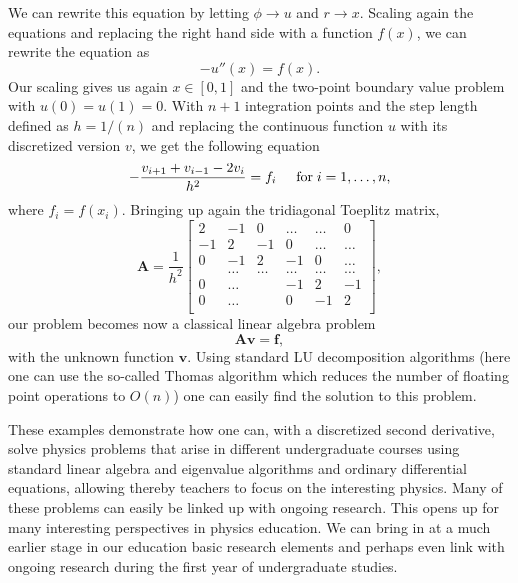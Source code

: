 \documentclass[graybox,envcountchap,sectrefs]{svmult}
\begin{document}
We can  rewrite this equation by letting $\phi\rightarrow u$ and
$r\rightarrow x$.  Scaling again the equations and replacing the right hand side with a function $f(x)$, we can rewrite the
equation as
\[
-u''(x) = f(x).
\]
Our scaling gives us again $x\in [0,1]$ and the two-point boundary value problem
with $u(0)=u(1)=0$. With $n+1$ integration points and
the step length defined as $h=1/(n)$ and replacing the continuous function $u$ with its discretized version $v$, we get
the following equation
\begin{equation*}
   -\frac{v_{i+1}+v_{i-1}-2v_i}{h^2} = f_i  \hspace{0.5cm} \mathrm{for} \hspace{0.1cm} i=1,\dots, n,
\end{equation*}
where $f_i=f(x_i)$.
Bringing up again the tridiagonal Toeplitz matrix,
\[
    \mathbf{A} = \frac{1}{h^2}\begin{bmatrix}
                           2& -1& 0 &\dots   & \dots &0 \\
                           -1 & 2 & -1 &0 &\dots &\dots \\
                           0&-1 &2 & -1 & 0 & \dots \\
                           & \dots   & \dots &\dots   &\dots & \dots \\
                           0&\dots   &  &-1 &2& -1 \\
                           0&\dots    &  & 0  &-1 & 2 \\
                      \end{bmatrix},
\]
our problem becomes now a classical linear algebra problem
\[
\mathbf{A}\mathbf{v}=\mathbf{f},
\]
with the unknown function $\mathbf{v}$. Using standard LU
decomposition algorithms \cite{GolubVanLoan} (here one can use
the so-called Thomas algorithm which reduces the number of floating
point operations to $O(n)$) one can easily find the solution to this
problem.

These examples demonstrate how one can, with a discretized second
derivative, solve physics problems that arise in different
undergraduate courses using standard linear algebra and eigenvalue
algorithms and ordinary differential equations, allowing thereby
teachers to focus on the interesting physics. Many of these problems
can easily be linked up with ongoing research. This opens up for many
interesting perspectives in physics education. We can bring in at a
much earlier stage in our education basic research elements and
perhaps even link with ongoing research during the first year of
undergraduate studies.
\end{document}
